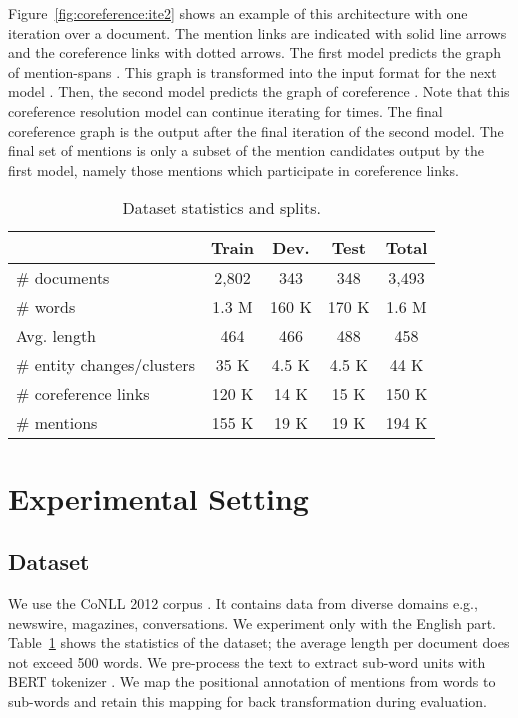 \documentclass[11pt]{article}
\begin{document}
Figure~\ref{fig:coreference:ite2} shows an example of this architecture with one iteration over a document. The mention links are indicated with solid line arrows and the coreference links with dotted arrows. The first model predicts the graph of mention-spans . This graph is transformed into the input format for the next model . Then, the second model predicts the graph of coreference . Note that this coreference resolution model can continue iterating for  times. The final coreference graph is the output after the final iteration of the second model.  The final set of mentions is only a subset of the mention candidates output by the first model, namely those mentions which participate in coreference links.




\begin{table}
	\centering
	\begin{adjustbox}{width=\linewidth}
	\begin{tabular}{l c c c c} 
		\toprule
		& \textbf{Train} &  \textbf{Dev.} &  \textbf{Test} &  \textbf{Total} \\ \hline			
		\# documents & 2,802 & 343& 348 & 3,493\\
		\# words  & 1.3 M & 160 K& 170 K & 1.6 M\\
		Avg. length  & 464 & 466 & 488 & 458 \\ \hline	
		\# entity changes/clusters & 35 K & 4.5 K & 4.5 K & 44 K   \\
		\# coreference links & 120 K & 14 K & 15 K & 150 K  \\
		\# mentions & 155 K & 19 K & 19 K & 194 K   \\
		\bottomrule
	\end{tabular} 
	\end{adjustbox}
	\caption{Dataset statistics and splits.}
	\label{tab:coreference:data}
\end{table}






\section{Experimental Setting} 
\label{sec:coreference:experiments}


\subsection{Dataset}
We use the CoNLL 2012 corpus \cite{pradhan-etal-2012-conll}. It contains data from diverse domains e.g., newswire, magazines, conversations.  We experiment only with the English part. Table~\ref{tab:coreference:data} shows the statistics of the dataset; the average length per document does not exceed 500 words. We pre-process the text to extract sub-word units \cite{sennrich-etal-2016-neural} with BERT tokenizer \cite{wu2016google}. We map the positional annotation of mentions from words to sub-words and retain this mapping for back transformation during evaluation. 
\end{document}
